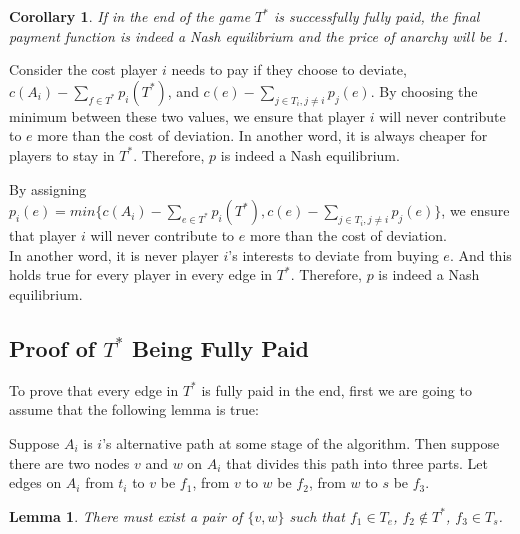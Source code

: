 \documentclass[11pt,psfig,times]{article}
\newtheorem{corollary}{Corollary}[section]
\newtheorem{lemma}{Lemma}[section]
\begin{document}
	
\begin{corollary}
	If in the end of the game $T^*$ is successfully fully paid, the final payment function is indeed a Nash equilibrium and the price of anarchy will be 1.
\end{corollary}
Consider the cost player \(i\) needs to pay if they choose to deviate, \(c(A_i) - \sum_{f\in T^*}p_i(T^*)\), and \(c(e) - \sum_{j\in T_i,j\neq i}p_j(e)\). By choosing the minimum between these two values, we ensure that player \(i\) will never contribute to \(e\) more than the cost of deviation. In another word, it is always  cheaper for players to stay in \(T^*\). Therefore, \(p\) is indeed a Nash equilibrium. 

By assigning $p_i(e) = min\{c(A_i) - \sum_{e\in T^*}p_i(T^*), c(e) - \sum_{j\in T_i,j\neq i}p_j(e)\}$, we ensure that player \(i\) will never contribute to \(e\) more than the cost of deviation. \\
In another word, it is never player $i$'s interests to deviate from buying $e$. And this holds true for every player in every edge in $T^*$. Therefore, \(p\) is indeed a Nash equilibrium. 

\subsection{Proof of $T^*$ Being Fully Paid}

To prove that every edge in \(T^*\) is fully paid in the end, first we are going to assume that the following lemma is true:

	Suppose \(A_i\) is \(i\)'s alternative path at some stage of the algorithm. Then suppose there are two nodes \(v\) and \(w\) on \(A_i\) that divides this path into three parts. Let edges on \(A_i\) from \(t_i\) to \(v\) be \(f_1\), from \(v\) to \(w\) be \(f_2\), from \(w\) to \(s\) be \(f_3\).
	\begin{lemma}
		There must exist a pair of \(\{v,w\}\) such that \(f_1 \in T_e\), \(f_2 \notin T^*\), \(f_3 \in T_s\).
	\end{lemma}
\end{document}
